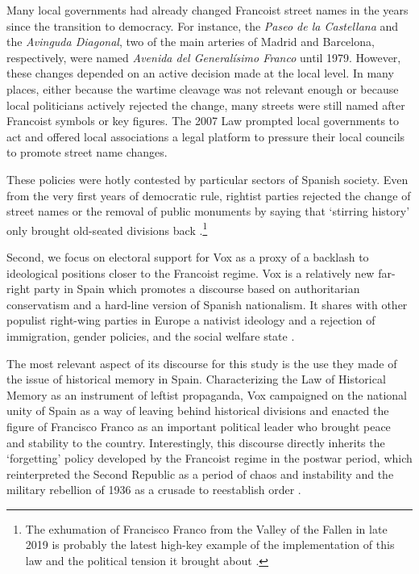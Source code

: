 \documentclass[12pt, notitlepage]{article}
\begin{document}
Many local governments had already changed Francoist street names in the years since the transition to democracy.
For instance, the \textit{Paseo de la Castellana} and the \textit{Avinguda Diagonal}, two of the main arteries of Madrid and Barcelona, respectively, were named \textit{Avenida del Generalísimo Franco} until 1979.
However, these changes depended on an active decision made at the local level.
In many places, either because the wartime cleavage was not relevant enough or because local politicians actively rejected the change, many streets were still named after Francoist symbols or key figures.
The 2007 Law prompted local governments to act and offered local associations a legal platform to pressure their local councils to promote street name changes.

These policies were hotly contested by particular sectors of Spanish society. Even from the very first years of democratic rule, rightist parties rejected the change of street names or the removal of public monuments by saying that `stirring history' only brought old-seated divisions back \citep[e.g.][]{Fuente:1980aa}.\footnote{The exhumation of Francisco Franco from the Valley of the Fallen in late 2019 is probably the latest high-key example of the implementation of this law and the political tension it brought about \citep{Taladrid:2019aa}.}

Second, we focus on electoral support for Vox as a proxy of a backlash to ideological positions closer to the Francoist regime.
Vox is a relatively new far-right party in Spain which promotes a discourse based on authoritarian conservatism and a hard-line version of Spanish nationalism. It shares with other populist right-wing parties in Europe a nativist ideology and a rejection of immigration, gender policies, and the social welfare state \citep{Turnbull-Dugarte:2019aa, Turnbull-Dugarte:2020aa}.

The most relevant aspect of its discourse for this study is the use they made of the issue of historical memory in Spain.
Characterizing the Law of Historical Memory as an instrument of leftist propaganda, Vox campaigned on the national unity of Spain as a way of leaving behind historical divisions and enacted the figure of Francisco Franco as an important political leader who brought peace and stability to the country.
Interestingly, this discourse directly inherits the `forgetting' policy developed by the Francoist regime in the postwar period, which reinterpreted the  Second Republic as a period of chaos and instability and the military rebellion of 1936 as a crusade to reestablish order \citep{Palomares:2004aa}.
\end{document}
